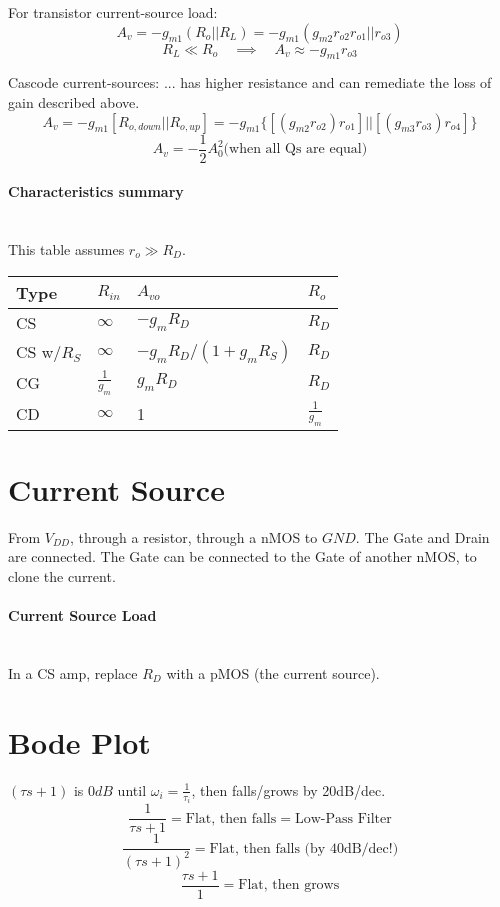 \documentclass[twocolumn]{article}
\begin{document}
      For transistor current-source load:
      $$A_v = -g_{m1} (R_o || R_L) = -g_{m1} (g_{m2}r_{o2}r_{o1} || r_{o3})$$
      $$R_L \ll R_o \quad\implies\quad A_v \approx -g_{m1}r_{o3}$$

      Cascode current-sources:
      ... has higher resistance and can remediate the loss of gain
      described above.
      $$A_v = -g_{m1}[R_{o,down} || R_{o,up}]
        = -g_{m1} \{ [(g_{m2}r_{o2})r_{o1}] || [(g_{m3}r_{o3})r_{o4}] \}
        $$
      $$A_v = -\frac{1}{2} A_0^2 \text{(when all Qs are equal)}$$

    \paragraph{Characteristics summary} \hfill \\
      This table assumes $r_o \gg R_D$.
      \begin{tabular}{|l|l|l|l|}
        \hline
        Type       & $R_{in}$        & $A_{vo}$                 & $R_o$ \\
        \hline
        CS         & $\infty$        & $-g_m R_D$               & $R_D$ \\
        CS w/$R_S$ & $\infty$        & $-g_mR_D / (1 + g_mR_S)$ & $R_D$ \\
        CG         & $\frac{1}{g_m}$ & $g_m R_D$                & $R_D$ \\
        CD         & $\infty$        & 1                   & $\frac{1}{g_m}$ \\
        \hline
      \end{tabular}

  \section{Current Source}
    From $V_{DD}$, through a resistor, through a nMOS to $GND$.
    The Gate and Drain are connected.
    The Gate can be connected to the Gate of another nMOS, to clone the current.

    \paragraph{Current Source Load} \hfill \\
      In a CS amp, replace $R_D$ with a pMOS (the current source).

  \section{Bode Plot}
    $(\tau s + 1)$ is $0dB$ until $\omega_i = \frac{1}{\tau_i}$, then
    falls/grows by 20dB/dec.
    $$\frac{1}{\tau s + 1} = \text{Flat, then falls} = \text{Low-Pass Filter}$$
    $$\frac{1}{(\tau s + 1)^2} = \text{Flat, then falls (by 40dB/dec!)}$$
    $$\frac{\tau s + 1}{1} = \text{Flat, then grows}$$
\end{document}
